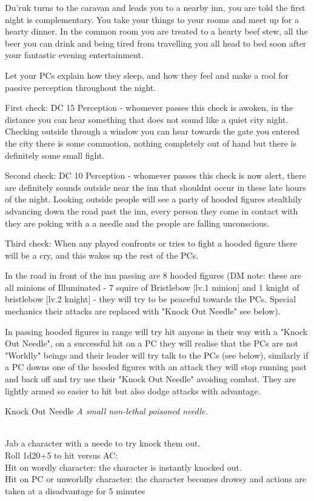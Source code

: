 \documentclass[10pt,twoside,twocolumn]{article}
\begin{document}
\begin{quotebox}
Du'ruk turns to the caravan and leads you to a nearby inn, you are told the first night is complementary. You take your things to your rooms and meet up for a hearty dinner. In the common room you are treated to a hearty beef stew, all the beer you can drink and being tired from travelling you all head to bed soon after your fantastic evening entertainment.
\end{quotebox}

Let your PCs explain how they sleep, and how they feel and make a rool for passive perception throughout the night.

First check: DC 15 Perception - whomever passes this check is awoken, in the distance you can hear something that does not sound like a quiet city night. Checking outside through a window you can hear towards the gate you entered the city there is some commotion, nothing completely out of hand but there is definitely some small fight.

Second check: DC 10 Perception - whomever passes this check is now alert, there are definitely sounds outside near the inn that shouldnt occur in these late hours of the night. Looking outside people will see a party of hooded figures stealthily advancing down the road past the inn, every person they come in contact with they are poking with a a needle and the people are falling unconscious.

Third check: When any played confronts or tries to fight a hooded figure there will be a cry, and this wakes up the rest of the PCs.

In the road in front of the inn passing are 8 hooded figures (DM note: these are all minions of Illuminated - 7 squire of Bristlebow [lv.1 minion] and 1 knight of bristlebow [lv.2 knight] - they will try to be peaceful towards the PCs. Special mechanics their attacks are replaced with "Knock Out Needle" see below).

In passing hooded figures in range will try hit anyone in their way with a "Knock Out Needle", on a successful hit on a PC they will realise that the PCs are not "Worldly" beings and their leader will try talk to the PCs (see below), similarly if a PC downs one of the hooded figures with an attack they will stop running past and back off and try use their "Knock Out Needle" avoiding combat. They are lightly armed so easier to hit but also dodge attacks with advantage.

\begin{itembox}{Knock Out Needle}
	\textit{A small non-lethal poisoned needle.}\\
	\hline \\[1mm]
	\begin{itemaction}
		Jab a character with a neede to try knock them out.\\
		Roll 1d20+5 to hit versus AC:\\
		Hit on wordly character: the character is instantly knocked out.\\
		Hit on PC or unworldly character: the character becomes drowsy and actions are taken at a disadvantage for 5 minutes
	\end{itemaction}
\end{itembox}
\end{document}
